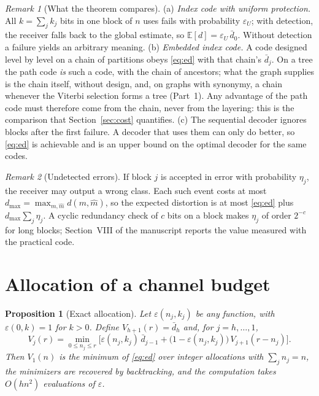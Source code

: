 \documentclass[11pt]{article}
\newtheorem{proposition}[theorem]{Proposition}
\theoremstyle{definition}
\theoremstyle{remark}
\newtheorem{remark}{Remark}
\newcommand{\E}{\mathbb{E}}
\begin{document}
\begin{remark}[What the theorem compares]\label{rem:baselines}
(a) \emph{Index code with uniform protection.} All $k=\sum_jk_j$ bits in one block of $n$ uses fails with probability $\varepsilon_U$; with detection, the receiver falls back to the global estimate, so $\E[d]=\varepsilon_U\,\bar d_0$. Without detection a failure yields an arbitrary meaning. (b) \emph{Embedded index code.} A code designed level by level on a chain of partitions obeys \eqref{eq:ed} with that chain's $\bar d_j$. On a tree the path code \emph{is} such a code, with the chain of ancestors; what the graph supplies is the chain itself, without design, and, on graphs with synonymy, a chain whenever the Viterbi selection forms a tree (Part~1). Any advantage of the path code must therefore come from the chain, never from the layering: this is the comparison that Section~\ref{sec:cost} quantifies. (c) The sequential decoder ignores blocks after the first failure. A decoder that uses them can only do better, so \eqref{eq:ed} is achievable and is an upper bound on the optimal decoder for the same codes.
\end{remark}

\begin{remark}[Undetected errors]\label{rem:undetected}
If block $j$ is accepted in error with probability $\eta_j$, the receiver may output a wrong class. Each such event costs at most $d_{\max}=\max_{m,\hat m}d(m,\hat m)$, so the expected distortion is at most \eqref{eq:ed} plus $d_{\max}\sum_j\eta_j$. A cyclic redundancy check of $c$ bits on a block makes $\eta_j$ of order $2^{-c}$ for long blocks; Section~VIII of the manuscript reports the value measured with the practical code.
\end{remark}

\section{Allocation of a channel budget}

\begin{proposition}[Exact allocation]\label{prop:dp}
Let $\varepsilon(n_j,k_j)$ be any function, with $\varepsilon(0,k)=1$ for $k>0$. Define $V_{h+1}(r)=\bar d_h$ and, for $j=h,\dots,1$,
\[
V_j(r)=\min_{0\le n_j\le r}\Big[\varepsilon(n_j,k_j)\,\bar d_{j-1}+\big(1-\varepsilon(n_j,k_j)\big)\,V_{j+1}(r-n_j)\Big].
\]
Then $V_1(n)$ is the minimum of \eqref{eq:ed} over integer allocations with $\sum_jn_j=n$, the minimizers are recovered by backtracking, and the computation takes $O(hn^2)$ evaluations of $\varepsilon$.
\end{proposition}
\end{document}
